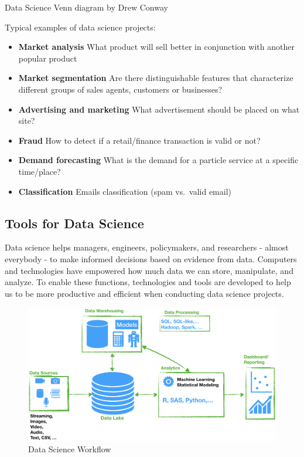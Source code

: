 \documentclass[
  letterpaper,
  DIV=11,
  numbers=noendperiod]{scrreprt}
\providecommand{\tightlist}{%
  \setlength{\itemsep}{0pt}\setlength{\parskip}{0pt}}\usepackage{longtable,booktabs,array}
\begin{document}
Data Science Venn diagram by Drew Conway

Typical examples of data science projects:

\begin{itemize}
\tightlist
\item
  \textbf{Market analysis} What product will sell better in conjunction
  with another popular product
\item
  \textbf{Market segmentation} Are there distinguishable features that
  characterize different groups of sales agents, customers or
  businesses?
\item
  \textbf{Advertising and marketing} What advertisement should be placed
  on what site?
\item
  \textbf{Fraud} How to detect if a retail/finance transaction is valid
  or not?
\item
  \textbf{Demand forecasting} What is the demand for a particle service
  at a specific time/place?
\item
  \textbf{Classification} Emails classification (spam vs.~valid email)
\end{itemize}

\hypertarget{tools-for-data-science-1}{%
\subsection*{Tools for Data Science}\label{tools-for-data-science-1}}

Data science helps managers, engineers, policymakers, and researchers -
almost everybody - to make informed decisions based on evidence from
data. Computers and technologies have empowered how much data we can
store, manipulate, and analyze. To enable these functions, technologies
and tools are developed to help us to be more productive and efficient
when conducting data science projects.

\begin{figure}

{\centering \includegraphics{img/DSWorkflow.png}

}

\caption{Data Science Workflow}

\end{figure}
\end{document}
